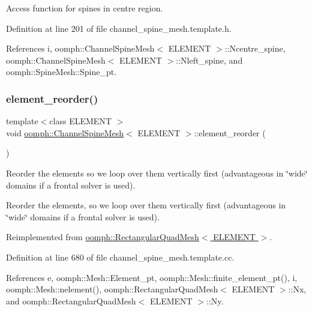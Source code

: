 Access function for spines in centre region. 



Definition at line 201 of file channel\+\_\+spine\+\_\+mesh.\+template.\+h.



References i, oomph\+::\+Channel\+Spine\+Mesh$<$ E\+L\+E\+M\+E\+N\+T $>$\+::\+Ncentre\+\_\+spine, oomph\+::\+Channel\+Spine\+Mesh$<$ E\+L\+E\+M\+E\+N\+T $>$\+::\+Nleft\+\_\+spine, and oomph\+::\+Spine\+Mesh\+::\+Spine\+\_\+pt.

\mbox{\label{classoomph_1_1ChannelSpineMesh_ad449460c4d06b2be64b53097143a3b09}} 
\subsubsection{\texorpdfstring{element\+\_\+reorder()}{element\_reorder()}}
{\footnotesize\ttfamily template$<$class E\+L\+E\+M\+E\+NT $>$ \\
void \hyperlink{classoomph_1_1ChannelSpineMesh}{oomph\+::\+Channel\+Spine\+Mesh}$<$ E\+L\+E\+M\+E\+NT $>$\+::element\+\_\+reorder (\begin{DoxyParamCaption}{ }\end{DoxyParamCaption})\hspace{0.3cm}{\ttfamily [virtual]}}



Reorder the elements so we loop over them vertically first (advantageous in \char`\"{}wide\char`\"{} domains if a frontal solver is used). 

Reorder the elements, so we loop over them vertically first (advantageous in \char`\"{}wide\char`\"{} domains if a frontal solver is used). 

Reimplemented from \hyperlink{classoomph_1_1RectangularQuadMesh_ae1e1d67808d4efb6e16a3835162a4504}{oomph\+::\+Rectangular\+Quad\+Mesh$<$ E\+L\+E\+M\+E\+N\+T $>$}.



Definition at line 680 of file channel\+\_\+spine\+\_\+mesh.\+template.\+cc.



References e, oomph\+::\+Mesh\+::\+Element\+\_\+pt, oomph\+::\+Mesh\+::finite\+\_\+element\+\_\+pt(), i, oomph\+::\+Mesh\+::nelement(), oomph\+::\+Rectangular\+Quad\+Mesh$<$ E\+L\+E\+M\+E\+N\+T $>$\+::\+Nx, and oomph\+::\+Rectangular\+Quad\+Mesh$<$ E\+L\+E\+M\+E\+N\+T $>$\+::\+Ny.



